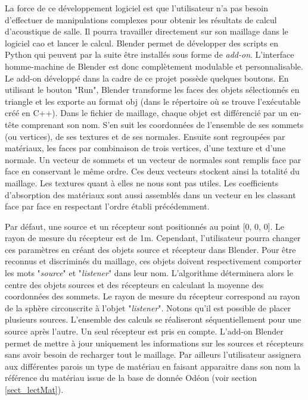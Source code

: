 La force de ce développement logiciel est que l'utilisateur n'a pas besoin d'effectuer de manipulations complexes pour obtenir les résultats de calcul d'acoustique de salle. Il pourra travailler directement sur son maillage dans le logiciel \gls{cao} et lancer le calcul. Blender permet de développer des scripts en Python qui peuvent par la suite être installés sous forme de \textit{add-on}. L'interface homme-machine de Blender est donc complètement modulable et personnalisable. Le add-on développé dans la cadre de ce projet possède quelques boutons. En utilisant le bouton "Run", Blender transforme les faces des objets sélectionnés en triangle et les exporte au format \gls{obj} (dans le répertoire où se trouve l'exécutable créé en C++). Dans le fichier de maillage, chaque objet est différencié par un en-tête comprenant son nom. S'en suit les coordonnées de l'ensemble de ses sommets (ou vertices), de ses textures et de ses normales. Ensuite sont regroupées par matériaux, les faces par combinaison de trois vertices, d'une texture et d'une normale. Un vecteur de sommets et un vecteur de normales sont remplis face par face en conservant le même ordre. Ces deux vecteurs stockent ainsi la totalité du maillage. Les textures quant à elles ne nous sont pas utiles. Les coefficients d'absorption des matériaux sont aussi assemblés dans un vecteur en les classant face par face en respectant l'ordre établi précédemment.

Par défaut, une source et un récepteur sont positionnés au point [0, 0, 0]. Le rayon de mesure du récepteur est de 1m. Cependant, l'utilisateur pourra changer ces paramètres en créant des objets source et récepteur dans Blender. Pour être reconnus et discriminés du maillage, ces objets doivent respectivement comporter les mots "\textit{source}" et "\textit{listener}" dans leur nom. L'algorithme déterminera alors le centre des objets sources et des récepteurs en calculant la moyenne des coordonnées des sommets. Le rayon de mesure du récepteur correspond au rayon de la sphère circonscrite à l'objet "\textit{listener}". Notons qu'il est possible de placer plusieurs sources. L'ensemble des calculs se réaliseront séquentiellement pour une source après l'autre. Un seul récepteur est pris en compte. L'add-on Blender permet de mettre à jour uniquement les informations sur les sources et récepteurs sans avoir besoin de recharger tout le maillage.
Par ailleurs l'utilisateur assignera aux différentes parois un type de matériau en faisant apparaitre dans son nom la référence du matériau issue de la base de donnée Odéon (voir section \ref{sect_lectMat}). 


